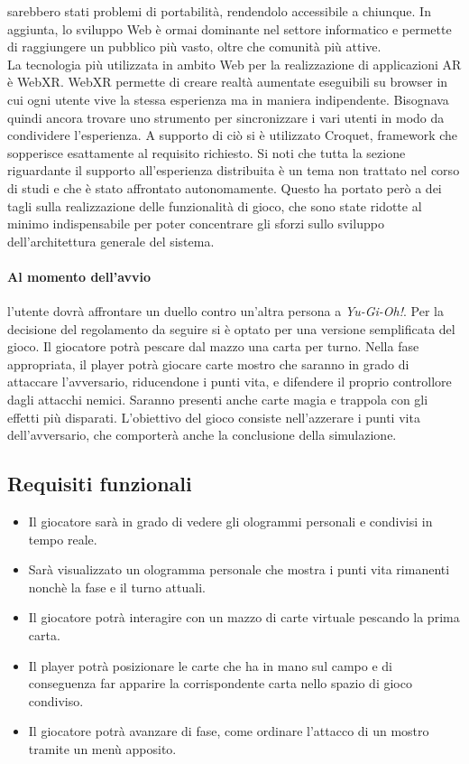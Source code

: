     sarebbero stati problemi di portabilità, rendendolo accessibile a chiunque. In aggiunta, lo sviluppo Web è ormai dominante nel settore informatico e permette di raggiungere un pubblico
    più vasto, oltre che comunità più attive.\\
    La tecnologia più utilizzata in ambito Web per la realizzazione di applicazioni AR è WebXR. WebXR permette di creare realtà aumentate eseguibili su browser in cui ogni utente
    vive la stessa esperienza ma in maniera indipendente. Bisognava quindi ancora trovare uno strumento per sincronizzare i vari utenti in modo da condividere l'esperienza. A supporto 
    di ciò si è utilizzato Croquet, framework che sopperisce esattamente al requisito richiesto. Si noti che tutta la sezione riguardante il supporto all'esperienza distribuita è un tema
    non trattato nel corso di studi e che è stato affrontato autonomamente. Questo ha portato però a dei tagli sulla realizzazione delle funzionalità di gioco, che sono state ridotte
    al minimo indispensabile per poter concentrare gli sforzi sullo sviluppo dell'architettura generale del sistema.\\
    \newline
    \paragraph{Al momento dell'avvio} l'utente dovrà affrontare un duello contro un'altra persona a \textit{Yu-Gi-Oh!}. Per la decisione del regolamento da seguire si è optato per
    una versione semplificata del gioco. Il giocatore potrà pescare dal mazzo una carta per turno. Nella fase appropriata, il player potrà giocare carte mostro che saranno in grado di 
    attaccare l'avversario, riducendone i punti vita, e difendere il proprio controllore dagli attacchi nemici. Saranno presenti anche carte magia e trappola con gli effetti più disparati.
    L'obiettivo del gioco consiste nell'azzerare i punti vita dell'avversario, che comporterà anche la conclusione della simulazione.

    \subsection{Requisiti funzionali}\label{subsec:requisitiFunzionali}
        \begin{itemize}
            \item Il giocatore sarà in grado di vedere gli ologrammi personali e condivisi in tempo reale.
            \item Sarà visualizzato un ologramma personale che mostra i punti vita rimanenti nonchè la fase e il turno attuali.
            \item Il giocatore potrà interagire con un mazzo di carte virtuale pescando la prima carta.
            \item Il player potrà posizionare le carte che ha in mano sul campo e di conseguenza far apparire la corrispondente carta nello spazio di gioco condiviso.
            \item Il giocatore potrà avanzare di fase, come ordinare l'attacco di un mostro tramite un menù apposito.
        \end{itemize}
